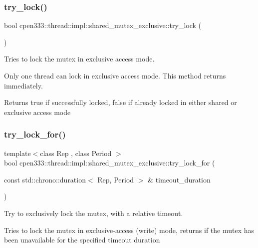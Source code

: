 \subsubsection{\texorpdfstring{try\+\_\+lock()}{try\_lock()}}
{\footnotesize\ttfamily bool cpen333\+::thread\+::impl\+::shared\+\_\+mutex\+\_\+exclusive\+::try\+\_\+lock (\begin{DoxyParamCaption}{ }\end{DoxyParamCaption})\hspace{0.3cm}{\ttfamily [inline]}}



Tries to lock the mutex in exclusive access mode. 

Only one thread can lock in exclusive access mode. This method returns immediately.

\begin{DoxyReturn}{Returns}
true if successfully locked, false if already locked in either shared or exclusive access mode 
\end{DoxyReturn}
\mbox{\label{classcpen333_1_1thread_1_1impl_1_1shared__mutex__exclusive_a1416304bf7a677384b1bd27a678bff9b}} 
\subsubsection{\texorpdfstring{try\+\_\+lock\+\_\+for()}{try\_lock\_for()}}
{\footnotesize\ttfamily template$<$class Rep , class Period $>$ \\
bool cpen333\+::thread\+::impl\+::shared\+\_\+mutex\+\_\+exclusive\+::try\+\_\+lock\+\_\+for (\begin{DoxyParamCaption}\item[{const std\+::chrono\+::duration$<$ Rep, Period $>$ \&}]{timeout\+\_\+duration }\end{DoxyParamCaption})\hspace{0.3cm}{\ttfamily [inline]}}



Try to exclusively lock the mutex, with a relative timeout. 

Tries to lock the mutex in exclusive-\/access (write) mode, returns if the mutex has been unavailable for the specified timeout duration


